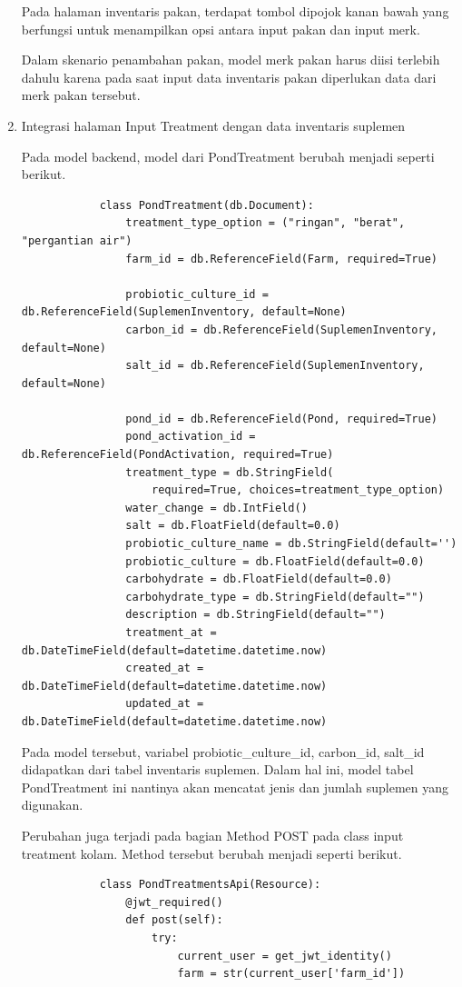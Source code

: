 \begin{spacing}{1.5}
\begin{enumerate}
		Pada halaman inventaris pakan, terdapat tombol dipojok kanan bawah yang berfungsi untuk menampilkan opsi antara input pakan dan input merk.

		Dalam skenario penambahan pakan, model merk pakan harus diisi terlebih dahulu karena pada saat input data inventaris pakan diperlukan data dari merk pakan tersebut.

		\item Integrasi halaman Input Treatment dengan data inventaris suplemen
		
		Pada model backend, model dari PondTreatment berubah menjadi seperti berikut.

		\begin{lstlisting}
			class PondTreatment(db.Document):
				treatment_type_option = ("ringan", "berat", "pergantian air")
				farm_id = db.ReferenceField(Farm, required=True)

				probiotic_culture_id = db.ReferenceField(SuplemenInventory, default=None)
				carbon_id = db.ReferenceField(SuplemenInventory, default=None)
				salt_id = db.ReferenceField(SuplemenInventory, default=None)

				pond_id = db.ReferenceField(Pond, required=True)
				pond_activation_id = db.ReferenceField(PondActivation, required=True)
				treatment_type = db.StringField(
					required=True, choices=treatment_type_option)
				water_change = db.IntField()
				salt = db.FloatField(default=0.0)
				probiotic_culture_name = db.StringField(default='')
				probiotic_culture = db.FloatField(default=0.0)
				carbohydrate = db.FloatField(default=0.0)
				carbohydrate_type = db.StringField(default="")
				description = db.StringField(default="")
				treatment_at = db.DateTimeField(default=datetime.datetime.now)
				created_at = db.DateTimeField(default=datetime.datetime.now)
				updated_at = db.DateTimeField(default=datetime.datetime.now)
		\end{lstlisting}

		Pada model tersebut, variabel probiotic\_culture\_id, carbon\_id, salt\_id didapatkan dari tabel inventaris suplemen. Dalam hal ini, model tabel PondTreatment ini nantinya akan mencatat jenis dan jumlah suplemen yang digunakan.
		
		Perubahan juga terjadi pada bagian Method POST pada class input treatment kolam. Method tersebut berubah menjadi seperti berikut.


		\begin{lstlisting}
			class PondTreatmentsApi(Resource):
				@jwt_required()
				def post(self):
					try:
						current_user = get_jwt_identity()
						farm = str(current_user['farm_id'])
						

\end{lstlisting}
\end{enumerate}
\end{spacing}
